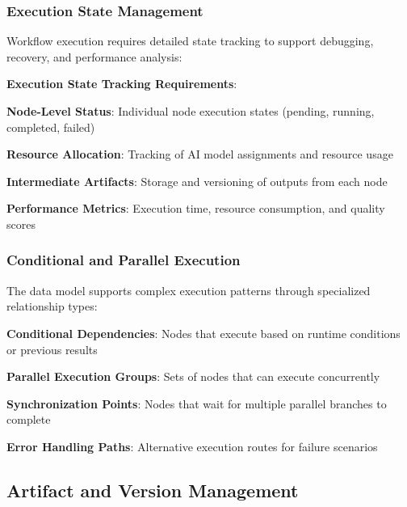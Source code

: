 \subsubsection*{Execution State Management}

Workflow execution requires detailed state tracking to support debugging, recovery, and performance analysis:

\begin{alertbox}
\textbf{Execution State Tracking Requirements}:
\begin{compactlist}
    \item \textbf{Node-Level Status}: Individual node execution states (pending, running, completed, failed)
    \item \textbf{Resource Allocation}: Tracking of AI model assignments and resource usage
    \item \textbf{Intermediate Artifacts}: Storage and versioning of outputs from each node
    \item \textbf{Performance Metrics}: Execution time, resource consumption, and quality scores
\end{compactlist}
\end{alertbox}

\subsubsection*{Conditional and Parallel Execution}

The data model supports complex execution patterns through specialized relationship types:

\begin{compactlist}
    \item \textbf{Conditional Dependencies}: Nodes that execute based on runtime conditions or previous results
    \item \textbf{Parallel Execution Groups}: Sets of nodes that can execute concurrently
    \item \textbf{Synchronization Points}: Nodes that wait for multiple parallel branches to complete
    \item \textbf{Error Handling Paths}: Alternative execution routes for failure scenarios
\end{compactlist}

\subsection*{Artifact and Version Management}

